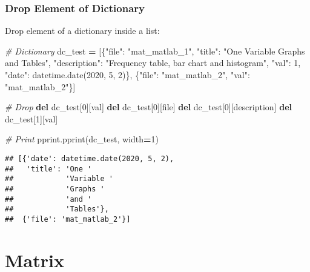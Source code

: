 \documentclass[
]{book}
\newenvironment{Shaded}{\begin{snugshade}}{\end{snugshade}}
\newcommand{\CommentTok}[1]{\textcolor[rgb]{0.56,0.35,0.01}{\textit{#1}}}
\newcommand{\DecValTok}[1]{\textcolor[rgb]{0.00,0.00,0.81}{#1}}
\newcommand{\KeywordTok}[1]{\textcolor[rgb]{0.13,0.29,0.53}{\textbf{#1}}}
\newcommand{\NormalTok}[1]{#1}
\newcommand{\OperatorTok}[1]{\textcolor[rgb]{0.81,0.36,0.00}{\textbf{#1}}}
\newcommand{\StringTok}[1]{\textcolor[rgb]{0.31,0.60,0.02}{#1}}
\begin{document}
\hypertarget{drop-element-of-dictionary}{%
\subsubsection{Drop Element of Dictionary}\label{drop-element-of-dictionary}}

Drop element of a dictionary inside a list:

\begin{Shaded}
\begin{Highlighting}[]
\CommentTok{\# Dictionary}
\NormalTok{dc\_test }\OperatorTok{=}\NormalTok{ [\{}\StringTok{"file"}\NormalTok{: }\StringTok{"mat\_matlab\_1"}\NormalTok{,}
           \StringTok{"title"}\NormalTok{: }\StringTok{"One Variable Graphs and Tables"}\NormalTok{,}
           \StringTok{"description"}\NormalTok{: }\StringTok{"Frequency table, bar chart and histogram"}\NormalTok{,}
           \StringTok{"val"}\NormalTok{: }\DecValTok{1}\NormalTok{,}
           \StringTok{"date"}\NormalTok{: datetime.date(}\DecValTok{2020}\NormalTok{, }\DecValTok{5}\NormalTok{, }\DecValTok{2}\NormalTok{)\},}
\NormalTok{           \{}\StringTok{"file"}\NormalTok{: }\StringTok{"mat\_matlab\_2"}\NormalTok{, }
            \StringTok{"val"}\NormalTok{: }\StringTok{"mat\_matlab\_2"}\NormalTok{\}]}

\CommentTok{\# Drop           }
\KeywordTok{del}\NormalTok{ dc\_test[}\DecValTok{0}\NormalTok{][}\StringTok{\textquotesingle{}val\textquotesingle{}}\NormalTok{]}
\KeywordTok{del}\NormalTok{ dc\_test[}\DecValTok{0}\NormalTok{][}\StringTok{\textquotesingle{}file\textquotesingle{}}\NormalTok{]}
\KeywordTok{del}\NormalTok{ dc\_test[}\DecValTok{0}\NormalTok{][}\StringTok{\textquotesingle{}description\textquotesingle{}}\NormalTok{]}
\KeywordTok{del}\NormalTok{ dc\_test[}\DecValTok{1}\NormalTok{][}\StringTok{\textquotesingle{}val\textquotesingle{}}\NormalTok{]}

\CommentTok{\# Print}
\NormalTok{pprint.pprint(dc\_test, width}\OperatorTok{=}\DecValTok{1}\NormalTok{)}
\end{Highlighting}
\end{Shaded}

\begin{verbatim}
## [{'date': datetime.date(2020, 5, 2),
##   'title': 'One '
##            'Variable '
##            'Graphs '
##            'and '
##            'Tables'},
##  {'file': 'mat_matlab_2'}]
\end{verbatim}

\hypertarget{matrix}{%
\section{Matrix}\label{matrix}}
\end{document}
